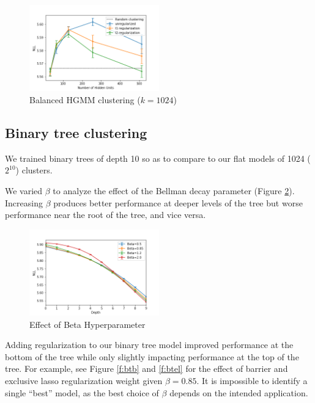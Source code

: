 \documentclass[11pt,letterpaper]{article}
\begin{document}
\begin{figure}
  \caption{Balanced HGMM clustering ($k=1024$)}
\label{f:fbgmm}
  \centering
    \includegraphics[width=0.5\textwidth]{flat_bgmm.png}
\end{figure}

\subsection{Binary tree clustering}

We trained binary trees of depth 10 so as to compare to our flat models of 1024 ($2^{10}$) clusters.

We varied $\beta$ to analyze the effect of the Bellman decay parameter (Figure \ref{f:beta}). Increasing $\beta$ produces better performance at deeper levels of the tree but worse performance near the root of the tree, and vice versa.

\begin{figure}
  \caption{Effect of Beta Hyperparameter}
\label{f:beta}
  \centering
    \includegraphics[width=0.5\textwidth]{skipgram_tree.png}
\end{figure}

Adding regularization to our binary tree model improved performance at the bottom of the tree while only slightly impacting performance at the top of the tree. For example, see Figure \ref{f:btb} and \ref{f:btel} for the effect of barrier and exclusive lasso regularization weight given $\beta=0.85$. It is impossible to identify a single ``best'' model, as the best choice of $\beta$ depends on the intended application.
\end{document}
